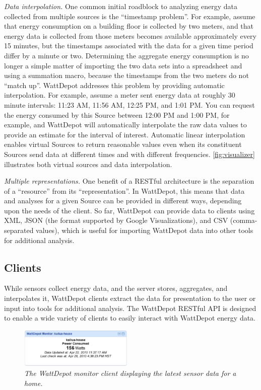 \documentclass[conference]{IEEEtran}
\begin{document}
{\em Data interpolation.} One common initial roadblock to analyzing energy
data collected from multiple sources is the ``timestamp problem''. For
example, assume that energy consumption on a building floor is collected by
two meters, and that energy data is collected from those meters becomes
available approximately every 15 minutes, but the timestamps associated
with the data for a given time period differ by a minute or two.
Determining the aggregate energy consumption is no longer a simple matter
of importing the two data sets into a spreadsheet and using a summation
macro, because the timestamps from the two meters do not ``match up''.
WattDepot addresses this problem by providing automatic interpolation. For
example, assume a meter sent energy data at roughly 30 minute intervals:
11:23 AM, 11:56 AM, 12:25 PM, and 1:01 PM.  You can request the energy consumed
by this Source between 12:00 PM and 1:00 PM, for example, and WattDepot will
automatically interpolate the raw data values to provide an estimate for
the interval of interest.  Automatic linear interpolation enables virtual Sources
to return reasonable values even when its constituent Sources send data at
different times and with different frequencies.  \figurename \ref{fig:visualizer}
illustrates both virtual sources and data interpolation. 

{\em Multiple representations.} One benefit of a RESTful architecture is
the separation of a ``resource'' from its ``representation''.  In
WattDepot, this means that data and analyses for a given Source can be
provided in different ways, depending upon the needs of the client.  So
far, WattDepot can provide data to clients using XML, JSON (the format
supported by Google Visualizations), and CSV (comma-separated values),
which is useful for importing WattDepot data into other tools for
additional analysis.

\subsection{Clients}

While sensors collect energy data, and the server stores, aggregates, and
interpolates it, WattDepot clients extract the data for presentation to the
user or input into tools for additional analysis.  The WattDepot RESTful
API is designed to enable a wide variety of clients to easily interact with
WattDepot energy data.  

\begin{figure}[thb]
  \center
  \includegraphics[width=0.48\textwidth]{monitor.eps}
  \caption{\em \small The WattDepot monitor client displaying the latest sensor
  data for a home.}
  \label{fig:monitor}
\end{figure}
\end{document}
